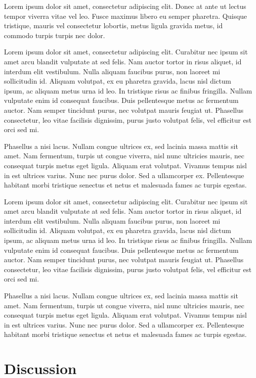 \documentclass[
]{article}
\begin{document}
Lorem ipsum dolor sit amet, consectetur adipiscing elit. Donec at ante
ut lectus tempor viverra vitae vel leo. Fusce maximus libero eu semper
pharetra. Quisque tristique, mauris vel consectetur lobortis, metus
ligula gravida metus, id commodo turpis turpis nec dolor.

Lorem ipsum dolor sit amet, consectetur adipiscing elit. Curabitur nec
ipsum sit amet arcu blandit vulputate at sed felis. Nam auctor tortor in
risus aliquet, id interdum elit vestibulum. Nulla aliquam faucibus
purus, non laoreet mi sollicitudin id. Aliquam volutpat, ex eu pharetra
gravida, lacus nisl dictum ipsum, ac aliquam metus urna id leo. In
tristique risus ac finibus fringilla. Nullam vulputate enim id consequat
faucibus. Duis pellentesque metus ac fermentum auctor. Nam semper
tincidunt purus, nec volutpat mauris feugiat ut. Phasellus consectetur,
leo vitae facilisis dignissim, purus justo volutpat felis, vel efficitur
est orci sed mi.

Phasellus a nisi lacus. Nullam congue ultrices ex, sed lacinia massa
mattis sit amet. Nam fermentum, turpis ut congue viverra, nisl nunc
ultricies mauris, nec consequat turpis metus eget ligula. Aliquam erat
volutpat. Vivamus tempus nisl in est ultrices varius. Nunc nec purus
dolor. Sed a ullamcorper ex. Pellentesque habitant morbi tristique
senectus et netus et malesuada fames ac turpis egestas.

Lorem ipsum dolor sit amet, consectetur adipiscing elit. Curabitur nec
ipsum sit amet arcu blandit vulputate at sed felis. Nam auctor tortor in
risus aliquet, id interdum elit vestibulum. Nulla aliquam faucibus
purus, non laoreet mi sollicitudin id. Aliquam volutpat, ex eu pharetra
gravida, lacus nisl dictum ipsum, ac aliquam metus urna id leo. In
tristique risus ac finibus fringilla. Nullam vulputate enim id consequat
faucibus. Duis pellentesque metus ac fermentum auctor. Nam semper
tincidunt purus, nec volutpat mauris feugiat ut. Phasellus consectetur,
leo vitae facilisis dignissim, purus justo volutpat felis, vel efficitur
est orci sed mi.

Phasellus a nisi lacus. Nullam congue ultrices ex, sed lacinia massa
mattis sit amet. Nam fermentum, turpis ut congue viverra, nisl nunc
ultricies mauris, nec consequat turpis metus eget ligula. Aliquam erat
volutpat. Vivamus tempus nisl in est ultrices varius. Nunc nec purus
dolor. Sed a ullamcorper ex. Pellentesque habitant morbi tristique
senectus et netus et malesuada fames ac turpis egestas.

\hypertarget{discussion}{%
\section{Discussion}\label{discussion}}
\end{document}
